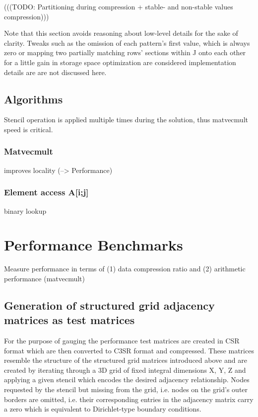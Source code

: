 \documentclass{article}
\begin{document}
    (((TODO: Partitioning during compression + stable- and non-stable values compression)))

    Note that this section avoids reasoning about low-level details for the sake of clarity. Tweaks such as the omission
    of each pattern's first value, which is always zero or mapping two partially matching rows' sections within J onto
    each other for a little gain in storage space optimization are considered implementation details are are not discussed
    here.

  \subsection{Algorithms}

    Stencil operation is applied multiple times during the solution, thus matvecmult speed is critical.

    \subsubsection{Matvecmult}

      improves locality (--> Performance)

    \subsubsection{Element access A[i;j]}
      binary lookup

\section{Performance Benchmarks}
  Measure performance in terms of (1) data compression ratio and (2) arithmetic performance (matvecmult)

  \subsection{Generation of structured grid adjacency matrices as test matrices}

    For the purpose of gauging the performance test matrices are created in CSR format which are then converted to C3SR
    format and compressed. These matrices resemble the structure of the structured grid matrices introduced above and
    are created by iterating through a 3D grid of fixed integral dimensions X, Y, Z and applying a given stencil
    which encodes the desired adjacency relationship. Nodes requested by the stencil but missing from the grid, i.e.
    nodes on the grid's outer borders are omitted, i.e. their corresponding entries in the adjacency matrix carry a zero
    which is equivalent to Dirichlet-type boundary conditions.
\end{document}
